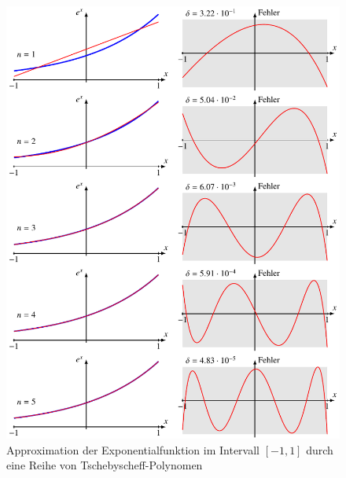 \begin{figure}
\centering
\includegraphics{chapters/020-orthofkt/images/chebexp.pdf}
\caption{Approximation der Exponentialfunktion im Intervall
$[-1,1]$ durch eine Reihe von Tschebyscheff-Polynomen
\label{buch:201:fig:exp}}
\end{figure}
